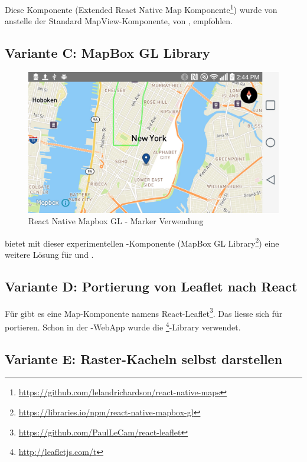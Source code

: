 Diese Komponente (Extended React Native Map Komponente\footnote{\url{https://github.com/lelandrichardson/react-native-maps}}) wurde von  anstelle der Standard MapView-Komponente, von , empfohlen.


\subsection{Variante C: MapBox GL Library}

\begin{figure}[H]
	\centering
	\includegraphics[width=\textwidth]{images/technischer_bericht/react-native-mapbox-gl.jpg}
	\caption{React Native Mapbox GL - Marker Verwendung}
	\label{image-variante-b-map}
\end{figure}

 bietet mit dieser experimentellen -Komponente (MapBox GL Library\footnote{\url{https://libraries.io/npm/react-native-mapbox-gl}}) eine weitere Lösung für  und .


\subsection{Variante D: Portierung von Leaflet nach React}

Für  gibt es eine Map-Komponente namens React-Leaflet\footnote{\url{https://github.com/PaulLeCam/react-leaflet}}. 
Das liesse sich für  portieren.
Schon in der \kort{}-\gls{WebApp} wurde die \footnote{\url{http://leafletjs.com/t}}-Library verwendet.

\subsection{Variante E: Raster-Kacheln selbst darstellen}

